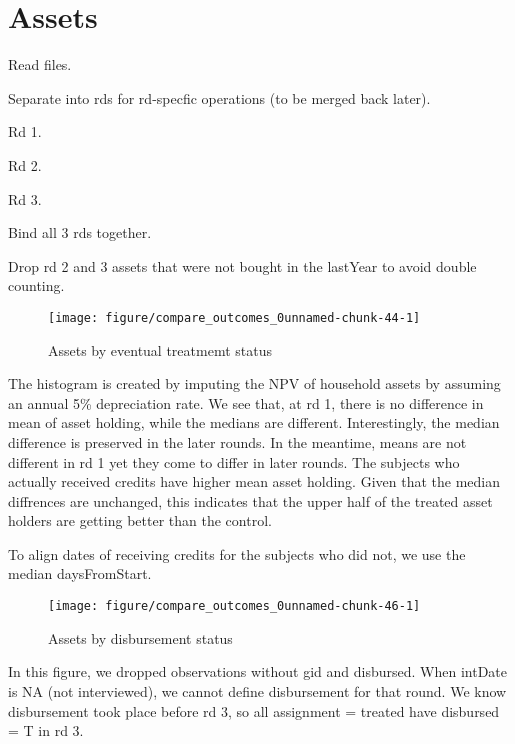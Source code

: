 \section{Assets}


Read files.

Separate into rds for rd-specfic operations (to be merged back later).

Rd 1.

Rd 2.

Rd 3.

Bind all 3 rds together.


Drop rd 2 and 3 assets that were not bought in the \textsf{lastYear} to avoid double counting.
\begin{Schunk}
\begin{figure}

{\centering \texttt{[image: figure/compare\_outcomes\_0unnamed-chunk-44-1]} 

}

\caption[Assets by eventual treatmemt status]{Assets by eventual treatmemt status}\label{Figureunnamed-chunk-44}
\end{figure}
\end{Schunk}
The histogram is created by imputing the NPV of household assets by assuming an annual 5\% depreciation rate. We see that, at rd 1, there is no difference in mean of asset holding, while the medians are different. Interestingly, the median difference is preserved in the later rounds. In the meantime, means are not different in rd 1 yet they come to differ in later rounds. The subjects who actually received credits have higher mean asset holding. Given that the median diffrences are unchanged, this indicates that the upper half of the treated asset holders are getting better than the control.

To align dates of receiving credits for the subjects who did not, we use the median \textsf{daysFromStart}. 

\begin{Schunk}
\begin{figure}

{\centering \texttt{[image: figure/compare\_outcomes\_0unnamed-chunk-46-1]} 

}

\caption[Assets by disbursement status]{Assets by disbursement status}\label{Figureunnamed-chunk-46}
\end{figure}
\end{Schunk}
In this figure, we dropped observations without \textsf{gid} and \textsf{disbursed}. When \textsf{intDate} is NA (not interviewed), we cannot define disbursement for that round. We know disbursement took place before rd 3, so all \textsf{assignment} = treated have \textsf{disbursed} = T in rd 3.

